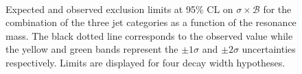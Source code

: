 \begin{figure}[htb]
\centering
{}
\\
\caption{
    Expected and observed exclusion limits at 95\% CL on $\sigma\times\mathcal{B}$ for the combination of the three jet categories as a function of the resonance mass. The black dotted line corresponds to the observed value while the yellow and green bands represent the $\pm 1 \sigma$ and $\pm 2 \sigma$ uncertainties respectively. Limits are displayed for four decay width hypotheses.}
    \label{fig:13TeVcombobslim}
\end{figure}

